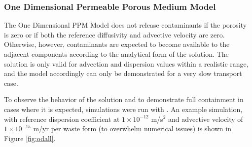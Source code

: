 

\subsubsection{One Dimensional Permeable Porous Medium Model}
The One Dimensional PPM Model does not release contaminants if the porosity is 
zero or if both the reference diffusivity and advective velocity are zero. 
Otherwise, however, contaminants are expected to  become available to the adjacent 
components according to the analytical form of the solution. The solution is 
only valid for advection and dispersion values within a realistic range, and 
the model accordingly can only be demonstrated for a very slow transport case. 

To observe the behavior of the solution and to demonstrate full containment in 
cases where it is expected, simulations were run with . An example simulation, with 
reference dispersion coefficient at $1\times 10^{-12}$ m/s$^2$ and advective 
velocity of $1\times 10^{-15}$ m/yr 
per waste form (to overwhelm numerical issues) is shown in Figure \ref{fig:odall}.  


\FloatBarrier
